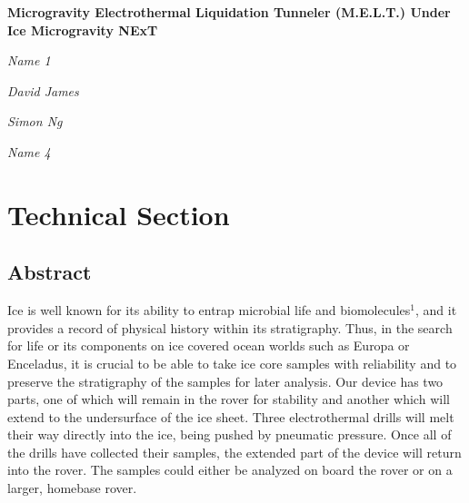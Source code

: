 \documentclass{article}
\begin{document}
\begin{titlepage}
\begin{center}

    \vspace{3cm}
    {\huge\bfseries Microgravity Electrothermal Liquidation Tunneler (M.E.L.T.) Under Ice Microgravity NExT\par}
    \vspace{10cm}
    {\Large\itshape Name 1\par}
    {\Large\itshape David James\par}
    {\Large\itshape Simon Ng\par}
    {\Large\itshape Name 4\par}

\end{center}
\end{titlepage}

\begin{titlepage}
\tableofcontents
\end{titlepage}

\section{Technical Section}
\subsection{Abstract}
Ice is well known for its ability to entrap microbial life and biomolecules$^1$, and it provides a record of physical history within its stratigraphy. Thus, in the search for life or its components on ice covered ocean worlds such as Europa or Enceladus, it is crucial to be able to take ice core samples with reliability and to preserve the stratigraphy of the samples for later analysis. Our device has two parts, one of which will remain in the rover for stability and another which will extend to the undersurface of the ice sheet. Three electrothermal drills will melt their way directly into the ice, being pushed by pneumatic pressure. Once all of the drills have collected their samples, the extended part of the device will return into the rover. The samples could either be analyzed on board the rover or on a larger, homebase rover.
\end{document}
